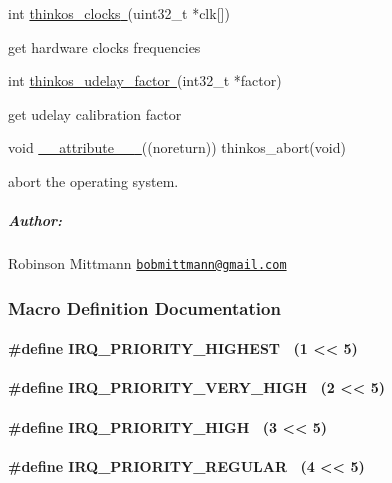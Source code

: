 {{int
}{\protect\hyperlink{h.34g0dwd}{thinkos\_clocks}}{\protect\hyperlink{h.34g0dwd}{~}}{(uint32\_t
*clk{[}{]})}

{get hardware clocks frequencies }

{int
}{\protect\hyperlink{h.1jlao46}{thinkos\_udelay\_factor}}{\protect\hyperlink{h.1jlao46}{~}}{(int32\_t
*factor)}

{get udelay calibration factor }

{void
}{\protect\hyperlink{h.43ky6rz}{\_\_attribute\_\_}}{\protect\hyperlink{h.43ky6rz}{~}}{((noreturn))
thinkos\_abort(void)}

{abort the operating system. }

{}

\subparagraph{\texorpdfstring{{Author:}}{Author:}}\label{author}

{Robinson Mittmann
}{\href{mailto:bobmittmann@gmail.com}{\nolinkurl{bobmittmann@gmail.com}}}{~}

{}

\subsubsection{\texorpdfstring{{Macro Definition
Documentation}}{Macro Definition Documentation}}\label{macro-definition-documentation}

\paragraph{\texorpdfstring{{\#define IRQ\_PRIORITY\_HIGHEST~ (1
\textless{}\textless{}
5)}}{\#define IRQ\_PRIORITY\_HIGHEST~ (1 \textless{}\textless{} 5)}}\label{define-irq_priority_highest-1-5}

\hypertarget{h.39kk8xu}{\paragraph{\texorpdfstring{{\#define
IRQ\_PRIORITY\_VERY\_HIGH~ (2 \textless{}\textless{}
5)}}{\#define IRQ\_PRIORITY\_VERY\_HIGH~ (2 \textless{}\textless{} 5)}}\label{h.39kk8xu}}

\hypertarget{h.1opuj5n}{\paragraph{\texorpdfstring{{\#define
IRQ\_PRIORITY\_HIGH~ (3 \textless{}\textless{}
5)}}{\#define IRQ\_PRIORITY\_HIGH~ (3 \textless{}\textless{} 5)}}\label{h.1opuj5n}}

\hypertarget{h.48pi1tg}{\paragraph{\texorpdfstring{{\#define
IRQ\_PRIORITY\_REGULAR~ (4 \textless{}\textless{}
5)}}{\#define IRQ\_PRIORITY\_REGULAR~ (4 \textless{}\textless{} 5)}}\label{h.48pi1tg}}

}
